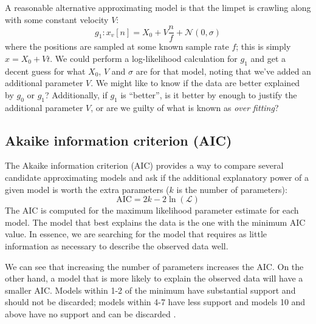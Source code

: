 A reasonable alternative approximating model is that the limpet is crawling along with some constant velocity $V$:
\begin{equation}
g_1:  x_v[n] = X_0 + V \frac{n}{f} + \mathcal{N}(0,\sigma)
\label{eq:constantv}
\end{equation}
where the positions are sampled at some known sample rate $f$; this is simply $x=X_0+Vt$.  We could perform a log-likelihood calculation for $g_1$ and get a decent guess for what $X_0$, $V$ and $\sigma$ are for that model, noting that we've added an additional parameter $V$.  We might like to know if the data are better explained by $g_0$ or $g_1$? Additionally, if $g_1$ is ``better'', is it better by enough to justify the additional parameter $V$, or are we guilty of what is known as \emph{over fitting}?

\subsection{Akaike information criterion (AIC)}
The Akaike information criterion (AIC) \cite{Akaike:1974} provides a way to compare several candidate approximating models and ask if the additional explanatory power of a given model is worth the extra parameters ($k$ is the number of parameters):  
\begin{equation}
\mbox{AIC} = 2 k - 2 \ln(\mathcal{L})
\end{equation}
The AIC is computed for the maximum likelihood parameter estimate for each model.  The model that best explains the data is the one with the minimum AIC value.  In essence, we are searching for the model that requires as little information as necessary to describe the observed data well.  

We can see that increasing the number of parameters increases the AIC. On the other hand, a model that is more likely to explain the observed data will have a smaller AIC.  Models within 1-2 of the minimum have substantial support and should not be discarded; models within 4-7 have less support and models 10 and above have no support and can be discarded \cite{Akaike:1974, Burnham:2002}.  


